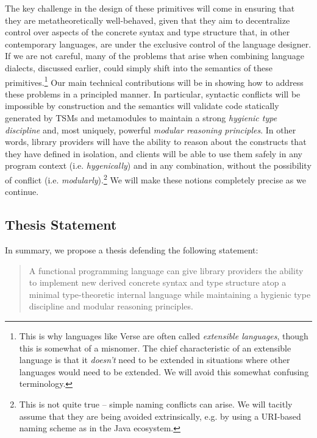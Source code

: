 The key challenge in the design of these primitives will come in ensuring that they are metatheoretically well-behaved, given that they aim to decentralize control over aspects of the concrete syntax and type structure that, in other contemporary languages, are under the exclusive control of the language designer. If we are not careful, many of the problems  that arise when combining language dialects, discussed earlier, could simply shift into the semantics of these primitives.\footnote{This is why languages  like Verse are often called \emph{extensible languages}, though this is somewhat of a misnomer. The chief characteristic of an extensible language is that it \emph{doesn't} need to be extended in situations where other languages would need to be extended. We will avoid this somewhat confusing terminology.} Our main technical contributions will be in showing how to address these problems in a principled manner. In particular, syntactic conflicts will be impossible by construction and the semantics will validate code statically generated by TSMs and metamodules to maintain a strong \emph{hygienic type discipline} and, most uniquely, powerful \emph{modular reasoning principles}. In other words, library providers will have the ability to reason about the constructs that they have defined in isolation, and clients will be able to use them safely in any program context (i.e. \emph{hygenically}) and in any combination, without the possibility of conflict (i.e. \emph{modularly}).\footnote{This is not quite true -- simple naming conflicts can arise. We will tacitly assume that they are being avoided extrinsically, e.g. by using a URI-based naming scheme as in the Java ecosystem.} We will make these notions completely precise as we continue.


\subsection{Thesis Statement}
In summary, we propose a thesis defending the following statement:
\begin{quote}
A functional programming language can give library providers the ability to %
implement new derived concrete syntax and type structure atop a minimal type-theoretic internal language while maintaining a hygienic type discipline and modular reasoning principles. %
\end{quote}

